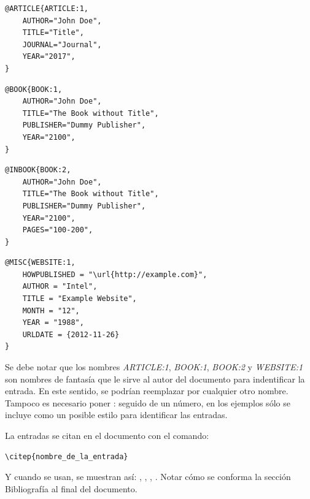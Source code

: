 \begin{lstlisting}
@ARTICLE{ARTICLE:1,
    AUTHOR="John Doe",
    TITLE="Title",
    JOURNAL="Journal",
    YEAR="2017",
}
\end{lstlisting}


\begin{lstlisting}
@BOOK{BOOK:1,
    AUTHOR="John Doe",
    TITLE="The Book without Title",
    PUBLISHER="Dummy Publisher",
    YEAR="2100",
}
\end{lstlisting}


\begin{lstlisting}
@INBOOK{BOOK:2,
    AUTHOR="John Doe",
    TITLE="The Book without Title",
    PUBLISHER="Dummy Publisher",
    YEAR="2100",
    PAGES="100-200",
}
\end{lstlisting}


\begin{lstlisting}
@MISC{WEBSITE:1,
    HOWPUBLISHED = "\url{http://example.com}",
    AUTHOR = "Intel",
    TITLE = "Example Website",
    MONTH = "12",
    YEAR = "1988",
    URLDATE = {2012-11-26}
}
\end{lstlisting}

Se debe notar que los nombres \emph{ARTICLE:1}, \emph{BOOK:1}, \emph{BOOK:2} y \emph{WEBSITE:1} son nombres de fantasía que le sirve al autor del documento para indentificar la entrada. En este sentido, se podrían reemplazar por cualquier otro nombre.  Tampoco es necesario poner : seguido de un número, en los ejemplos sólo se incluye como un posible estilo para identificar las entradas.

La entradas se citan en el documento con el comando: 

\begin{verbatim}
\citep{nombre_de_la_entrada}
\end{verbatim}

Y cuando se usan, se muestran así: \citep{ARTICLE:1}, \citep{BOOK:1}, \citep{BOOK:2}, \citep{WEBSITE:1}.  Notar cómo se conforma la sección Bibliografía al final del documento. 